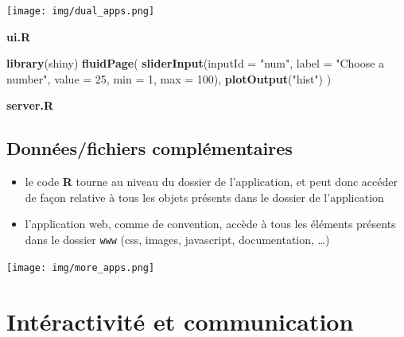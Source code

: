 \documentclass[
]{article}
\newenvironment{Shaded}{\begin{snugshade}}{\end{snugshade}}
\newcommand{\AttributeTok}[1]{\textcolor[rgb]{0.13,0.29,0.53}{#1}}
\newcommand{\ControlFlowTok}[1]{\textcolor[rgb]{0.13,0.29,0.53}{\textbf{#1}}}
\newcommand{\DecValTok}[1]{\textcolor[rgb]{0.00,0.00,0.81}{#1}}
\newcommand{\FunctionTok}[1]{\textcolor[rgb]{0.13,0.29,0.53}{\textbf{#1}}}
\newcommand{\NormalTok}[1]{#1}
\newcommand{\OtherTok}[1]{\textcolor[rgb]{0.56,0.35,0.01}{#1}}
\newcommand{\SpecialCharTok}[1]{\textcolor[rgb]{0.81,0.36,0.00}{\textbf{#1}}}
\newcommand{\StringTok}[1]{\textcolor[rgb]{0.31,0.60,0.02}{#1}}
\providecommand{\tightlist}{%
  \setlength{\itemsep}{0pt}\setlength{\parskip}{0pt}}
\begin{document}
\texttt{[image: img/dual\_apps.png]}

\textbf{ui.R}

\begin{Shaded}
\begin{Highlighting}[]
\FunctionTok{library}\NormalTok{(shiny)}
\FunctionTok{fluidPage}\NormalTok{(}
  \FunctionTok{sliderInput}\NormalTok{(}\AttributeTok{inputId =} \StringTok{"num"}\NormalTok{, }\AttributeTok{label =} \StringTok{"Choose a number"}\NormalTok{, }
              \AttributeTok{value =} \DecValTok{25}\NormalTok{, }\AttributeTok{min =} \DecValTok{1}\NormalTok{, }\AttributeTok{max =} \DecValTok{100}\NormalTok{),  }
  \FunctionTok{plotOutput}\NormalTok{(}\StringTok{"hist"}\NormalTok{)}
\NormalTok{)}
\end{Highlighting}
\end{Shaded}

\textbf{server.R}

\begin{Shaded}
\end{Shaded}

\hypertarget{donnuxe9esfichiers-compluxe9mentaires}{%
\subsection{Données/fichiers
complémentaires}\label{donnuxe9esfichiers-compluxe9mentaires}}

\begin{itemize}
\tightlist
\item
  le code \textbf{R} tourne au niveau du dossier de l'application, et
  peut donc accéder de façon relative à tous les objets présents dans le
  dossier de l'application
\item
  l'application web, comme de convention, accède à tous les éléments
  présents dans le dossier \texttt{www} (css, images, javascript,
  documentation, \ldots)
\end{itemize}

\texttt{[image: img/more\_apps.png]}

\hypertarget{intuxe9ractivituxe9-et-communication}{%
\section{Intéractivité et
communication}\label{intuxe9ractivituxe9-et-communication}}
\end{document}
